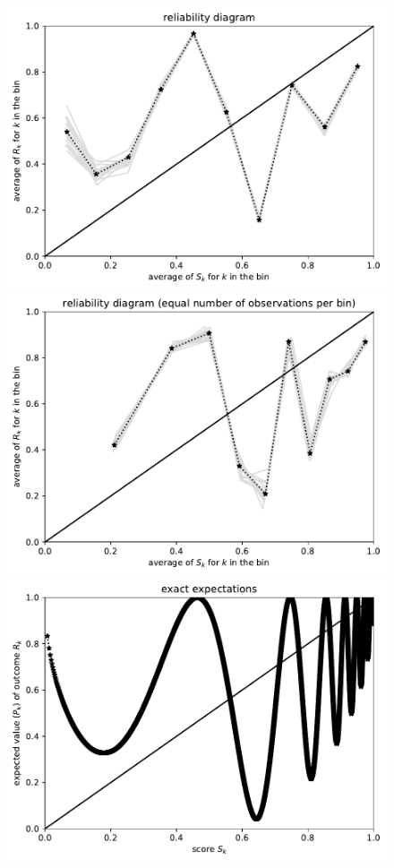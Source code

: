 \documentclass{article}
\begin{document}
\begin{figure}
\begin{centering}
\parbox{\imsize}{\includegraphics[width=\imsize]
                {./codes/unweighted/10000_10_2_1/equiprob.pdf}}
\quad\quad
\parbox{\imsize}{\includegraphics[width=\imsize]
                {./codes/unweighted/10000_10_2_1/equisamp.pdf}}

\vspace{\vertsep}

\parbox{\imsize}{\includegraphics[width=\imsize]
                {./codes/unweighted/10000_10_2_1/exact.pdf}}


\end{centering}
\end{figure}
\end{document}
